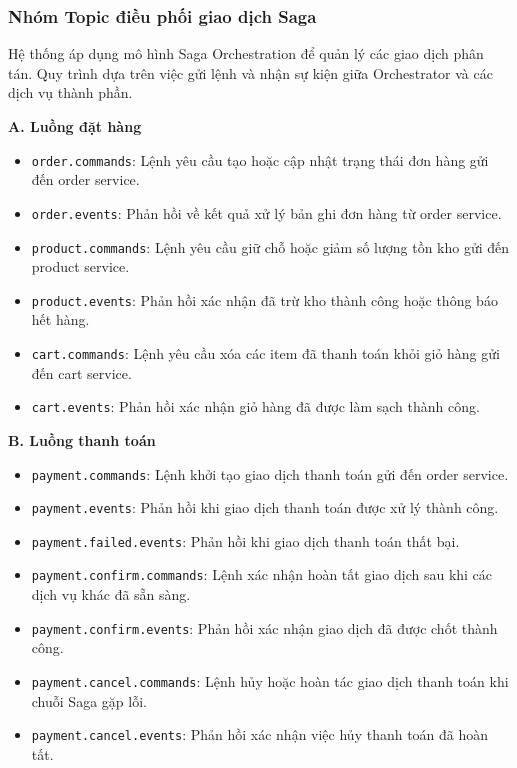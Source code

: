 \subsubsection{Nhóm Topic điều phối giao dịch Saga}

Hệ thống áp dụng mô hình Saga Orchestration để quản lý các giao dịch phân tán. Quy trình dựa trên việc gửi lệnh và nhận sự kiện giữa Orchestrator và các dịch vụ thành phần.

\textbf{A. Luồng đặt hàng}
\begin{itemize}
    \item \texttt{order.commands}: Lệnh yêu cầu tạo hoặc cập nhật trạng thái đơn hàng gửi đến order service.
    \item \texttt{order.events}: Phản hồi về kết quả xử lý bản ghi đơn hàng từ order service.
    \item \texttt{product.commands}: Lệnh yêu cầu giữ chỗ hoặc giảm số lượng tồn kho gửi đến product service.
    \item \texttt{product.events}: Phản hồi xác nhận đã trừ kho thành công hoặc thông báo hết hàng.
    \item \texttt{cart.commands}: Lệnh yêu cầu xóa các item đã thanh toán khỏi giỏ hàng gửi đến cart service.
    \item \texttt{cart.events}: Phản hồi xác nhận giỏ hàng đã được làm sạch thành công.
\end{itemize}

\textbf{B. Luồng thanh toán}
\begin{itemize}
    \item \texttt{payment.commands}: Lệnh khởi tạo giao dịch thanh toán gửi đến order service.
    \item \texttt{payment.events}: Phản hồi khi giao dịch thanh toán được xử lý thành công.
    \item \texttt{payment.failed.events}: Phản hồi khi giao dịch thanh toán thất bại.
    \item \texttt{payment.confirm.commands}: Lệnh xác nhận hoàn tất giao dịch sau khi các dịch vụ khác đã sẵn sàng.
    \item \texttt{payment.confirm.events}: Phản hồi xác nhận giao dịch đã được chốt thành công.
    \item \texttt{payment.cancel.commands}: Lệnh hủy hoặc hoàn tác giao dịch thanh toán khi chuỗi Saga gặp lỗi.
    \item \texttt{payment.cancel.events}: Phản hồi xác nhận việc hủy thanh toán đã hoàn tất.
\end{itemize}


